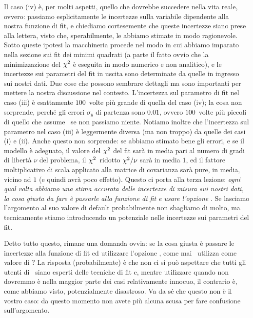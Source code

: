 
Il caso (iv) è, per molti aspetti, quello che dovrebbe succedere nella vita reale,
ovvero: passiamo esplicitamente le incertezze sulla variabile dipendente alla
nostra funzione di fit, e chiediamo cortesemente che queste incertezze siano
prese alla lettera, visto che, sperabilmente, le abbiamo stimate in modo
ragionevole. Sotto queste ipotesi la macchineria procede nel modo in
cui abbiamo imparato nella sezione sui fit dei minimi quadrati (a parte il fatto
ovvio che la minimizzazione del $\chi^2$ è eseguita in modo numerico e non
analitico), e le incertezze sui parametri del fit in uscita sono determinate da
quelle in ingresso sui nostri dati. Due cose che possono sembrare dettagli ma
sono importanti per mettere la nostra discussione nel contesto. L'incertezza sul
parametro di fit nel caso (iii) è esattamente $100$~volte più grande di
quella del caso (iv); la cosa non sorprende, perché gli errori $\sigma_y$ di
partenza sono $0.01$, ovvero $100$~volte più piccoli di quello che assume
\scipy\ se non passiamo niente.
Notiamo inoltre che l'incertezza sul parametro nel caso (iii) è leggermente
diversa (ma non troppo) da quelle dei casi (i) e (ii). Anche questo non
sorprende: se abbiamo stimato bene gli errori, e se il modello è adeguato,
il valore del $\chi^2$ del fit sarà in media pari al numero di gradi di
libertà $\nu$ del problema, il $\chi^2$~ridotto $\chi^2 / \nu$ sarà in media
$1$, ed il fattore moltiplicativo di scala applicato alla matrice di covarianza
sarà pure, in media, vicino ad $1$ (e quindi avrà poco effetto).
Questo ci porta alla terza lezione: \emph{ogni qual volta abbiamo una stima
accurata delle incertezze di misura sui nostri dati, la cosa giusta da fare è
passarle alla funzione di fit e usare l'opzione }.
Se lasciamo l'argomento  al suo valore di default probabilmente
non sbagliamo di molto, ma tecnicamente stiamo introducendo un potenziale
 nelle incertezze sui parametri del fit.

Detto tutto questo, rimane una domanda ovvia: se la cosa giusta è passare le
incertezze alla funzione di fit ed utilizzare l'opzione ,
come mai \scipy\ utilizza  come valore di
? La risposta (probabilmente) è che non ci si può aspettare che
tutti gli utenti di \scipy\ siano esperti delle tecniche di fit e, mentre
utilizzare  quando non dovremmo è nella maggior
parte dei casi relativamente innocuo, il contrario è, come abbiamo visto,
potenzialmente disastroso. Va da sé che questo non è il vostro caso: da questo
momento non avete più alcuna scusa per fare confusione sull'argomento.


